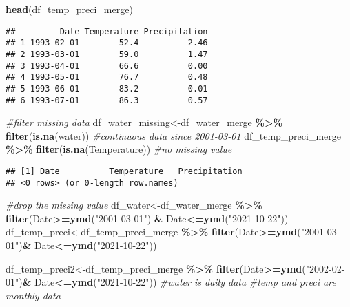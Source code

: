 \documentclass[
]{article}
\newenvironment{Shaded}{\begin{snugshade}}{\end{snugshade}}
\newcommand{\CommentTok}[1]{\textcolor[rgb]{0.56,0.35,0.01}{\textit{#1}}}
\newcommand{\FunctionTok}[1]{\textcolor[rgb]{0.13,0.29,0.53}{\textbf{#1}}}
\newcommand{\NormalTok}[1]{#1}
\newcommand{\OtherTok}[1]{\textcolor[rgb]{0.56,0.35,0.01}{#1}}
\newcommand{\SpecialCharTok}[1]{\textcolor[rgb]{0.81,0.36,0.00}{\textbf{#1}}}
\newcommand{\StringTok}[1]{\textcolor[rgb]{0.31,0.60,0.02}{#1}}
\begin{document}
\begin{Shaded}
\begin{Highlighting}[]
\FunctionTok{head}\NormalTok{(df\_temp\_preci\_merge)}
\end{Highlighting}
\end{Shaded}

\begin{verbatim}
##         Date Temperature Precipitation
## 1 1993-02-01        52.4          2.46
## 2 1993-03-01        59.0          1.47
## 3 1993-04-01        66.6          0.00
## 4 1993-05-01        76.7          0.48
## 5 1993-06-01        83.2          0.01
## 6 1993-07-01        86.3          0.57
\end{verbatim}

\begin{Shaded}
\begin{Highlighting}[]
\CommentTok{\#filter missing data}
\NormalTok{df\_water\_missing}\OtherTok{\textless{}{-}}\NormalTok{df\_water\_merge }\SpecialCharTok{\%\textgreater{}\%}
  \FunctionTok{filter}\NormalTok{(}\FunctionTok{is.na}\NormalTok{(water))  }\CommentTok{\#continuous data since 2001{-}03{-}01}
\NormalTok{df\_temp\_preci\_merge }\SpecialCharTok{\%\textgreater{}\%}
  \FunctionTok{filter}\NormalTok{(}\FunctionTok{is.na}\NormalTok{(Temperature)) }\CommentTok{\#no missing value }
\end{Highlighting}
\end{Shaded}

\begin{verbatim}
## [1] Date          Temperature   Precipitation
## <0 rows> (or 0-length row.names)
\end{verbatim}

\begin{Shaded}
\begin{Highlighting}[]
\CommentTok{\#drop the missing value }
\NormalTok{df\_water}\OtherTok{\textless{}{-}}\NormalTok{df\_water\_merge }\SpecialCharTok{\%\textgreater{}\%}
  \FunctionTok{filter}\NormalTok{(Date}\SpecialCharTok{\textgreater{}=}\FunctionTok{ymd}\NormalTok{(}\StringTok{"2001{-}03{-}01"}\NormalTok{) }\SpecialCharTok{\&}\NormalTok{ Date}\SpecialCharTok{\textless{}=}\FunctionTok{ymd}\NormalTok{(}\StringTok{"2021{-}10{-}22"}\NormalTok{))}
\NormalTok{df\_temp\_preci}\OtherTok{\textless{}{-}}\NormalTok{df\_temp\_preci\_merge }\SpecialCharTok{\%\textgreater{}\%}
  \FunctionTok{filter}\NormalTok{(Date}\SpecialCharTok{\textgreater{}=}\FunctionTok{ymd}\NormalTok{(}\StringTok{"2001{-}03{-}01"}\NormalTok{)}\SpecialCharTok{\&}\NormalTok{ Date}\SpecialCharTok{\textless{}=}\FunctionTok{ymd}\NormalTok{(}\StringTok{"2021{-}10{-}22"}\NormalTok{))}

\NormalTok{df\_temp\_preci2}\OtherTok{\textless{}{-}}\NormalTok{df\_temp\_preci\_merge }\SpecialCharTok{\%\textgreater{}\%}
  \FunctionTok{filter}\NormalTok{(Date}\SpecialCharTok{\textgreater{}=}\FunctionTok{ymd}\NormalTok{(}\StringTok{"2002{-}02{-}01"}\NormalTok{)}\SpecialCharTok{\&}\NormalTok{ Date}\SpecialCharTok{\textless{}=}\FunctionTok{ymd}\NormalTok{(}\StringTok{"2021{-}10{-}22"}\NormalTok{))}
\CommentTok{\#water is daily data}
\CommentTok{\#temp and preci are monthly data}
\end{Highlighting}
\end{Shaded}
\end{document}
